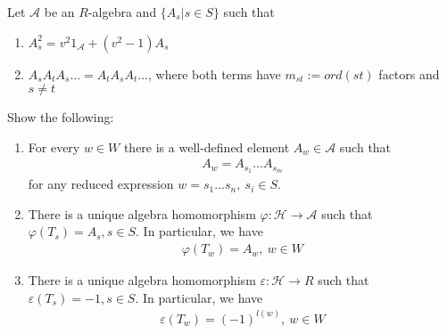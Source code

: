 \documentclass[]{article}
\begin{document}
\begin{exercise}
    Let \(\mathscr{A}\) be an \(R\)-algebra and \(\{A_s | s \in S\}\) such that
    \begin{enumerate}[label=\arabic*)]
        \item \(A_s^2 = v^2 1_\mathscr{A} + (v^2-1) A_s\)
        \label{first}
        \item \(A_s A_t A_s \dots = A_t A_s A_t \dots\), where both terms have \(m_{st}:=ord(st)\) factors and \(s \neq t\)
        \label{(M)}
    \end{enumerate}
    Show the following:
    \begin{enumerate}
        \item For every \(w \in W\) there is a well-defined element \(A_w \in \mathscr{A}\) such that 
            \begin{align*}
                A_w = A_{s_1} \dots A_{s_m}
            \end{align*}
        for any reduced expression \(w = s_1 \dots s_n, \ s_i \in S\). 
        \item There is a unique algebra homomorphism \(\varphi: \mathscr{H} \rightarrow \mathscr{A}\) such that \(\varphi(T_s)= A_s, s \in S\). 
        In particular, we have
        \begin{align*}
            \varphi(T_w) = A_w, \ w \in W
        \end{align*}
        \item There is a unique algebra homomorphism \(\varepsilon: \mathscr{H} \rightarrow R\) such that \(\varepsilon(T_s)= -1, s \in S\). 
        In particular, we have
        \begin{align*}
            \varepsilon(T_w)= (-1)^{l(w)}, \ w \in W
        \end{align*}
    \end{enumerate}
    \label{exercise1}
\end{exercise}
\end{document}

